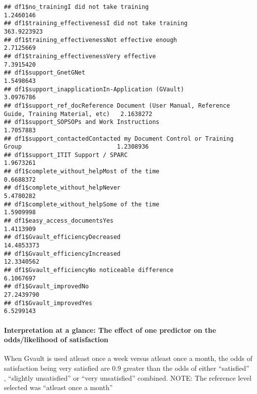 \documentclass[]{article}
\let\oldparagraph\paragraph
\renewcommand{\paragraph}[1]{\oldparagraph{#1}\mbox{}}
\begin{document}
\begin{verbatim}
## df1$no_trainingI did not take training                                                         1.2460146
## df1$training_effectivenessI did not take training                                            363.9223923
## df1$training_effectivenessNot effective enough                                                 2.7125669
## df1$training_effectivenessVery effective                                                       7.3915420
## df1$support_GnetGNet                                                                           1.5498643
## df1$support_inapplicationIn-Application (GVault)                                               3.0976786
## df1$support_ref_docReference Document (User Manual, Reference Guide, Training Material, etc)   2.1638272
## df1$support_SOPSOPs and Work Instructions                                                      1.7057883
## df1$support_contactedContacted my Document Control or Training Group                           1.2308936
## df1$support_ITIT Support / SPARC                                                               1.9673261
## df1$complete_without_helpMost of the time                                                      0.6688372
## df1$complete_without_helpNever                                                                 5.4780282
## df1$complete_without_helpSome of the time                                                      1.5909998
## df1$easy_access_documentsYes                                                                   1.4113909
## df1$Gvault_efficiencyDecreased                                                                14.4853373
## df1$Gvault_efficiencyIncreased                                                                12.3340562
## df1$Gvault_efficiencyNo noticeable difference                                                  6.1067697
## df1$Gvault_improvedNo                                                                         27.2439790
## df1$Gvault_improvedYes                                                                         6.5299143
\end{verbatim}

\paragraph{Interpretation at a glance: The effect of one predictor on
the odds/likelihood of
satisfaction}\label{interpretation-at-a-glance-the-effect-of-one-predictor-on-the-oddslikelihood-of-satisfaction}

When Gvault is used atleast once a week versus atleast once a month, the
odds of satisfaction being very satisfied are 0.9 greater than the odds
of either ``satisfied'' , ``slightly unsatisfied'' or ``very
unsatisfied'' combined. NOTE: The reference level selected was ``atleast
once a month''
\end{document}
